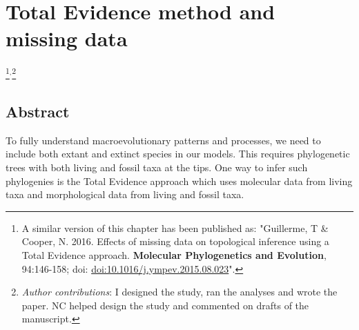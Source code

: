 

%
%

\chapter[Total Evidence method and missing data]{Total Evidence method and missing data}
\label{chap:TEM_paper}

\bigskip
\medskip
\begin{center}

\footnote{A similar version of this chapter has been published as: "Guillerme, T \& Cooper, N. 2016. Effects of missing data on topological inference using a Total Evidence approach. \textbf{Molecular Phylogenetics and Evolution}, 94:146-158; doi: \href{http://www.sciencedirect.com/science/article/pii/S1055790315002547}{doi:10.1016/j.ympev.2015.08.023}".}$^{,}$\footnote{\textit{Author contributions}: I designed the study, ran the analyses and wrote the paper. NC helped design the study and commented on drafts of the manuscript.}\\

\end{center}

%
%



\section*{Abstract}
To fully understand macroevolutionary patterns and processes, we need to include both extant and extinct species in our models.
This requires phylogenetic trees with both living and fossil taxa at the tips.
One way to infer such phylogenies is the Total Evidence approach which uses molecular data from living taxa and morphological data from living and fossil taxa.


